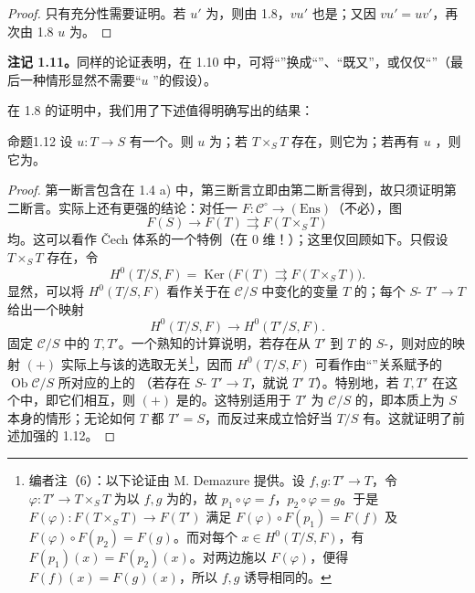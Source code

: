 \begin{proof}
只有充分性需要证明。若 $u'$ 为，则由 1.8，$vu'$ 也是；又因 $vu'=uv'$，再次由 1.8  $u$ 为。
\end{proof}
\textbf{注记 1.11。}同样的论证表明，在 1.10 中，可将“”换成“”、“既又”，或仅仅“”（最后一种情形显然不需要“$u$ ”的假设）。

在 1.8 的证明中，我们用了下述值得明确写出的结果：
\begin{SGAresult}{命题}{1.12}
设 $u:T\to S$ 有一个。则 $u$ 为；若 $T\times_S T$ 存在，则它为；若再有 $u$ ，则它为。
\end{SGAresult}
\begin{proof}
第一断言包含在 1.4 a) 中，第三断言立即由第二断言得到，故只须证明第二断言。实际上还有更强的结论：对任一 $F:\mathcal C^\circ\to(\mathrm{Ens})$（不必），图
\[
 F(S)\longrightarrow F(T)\rightrightarrows F(T\times_S T)
\]
均。这可以看作 Čech 体系的一个特例（在 $0$ 维！）；这里仅回顾如下。只假设 $T\times_S T$ 存在，令
\[
 H^0(T/S,F)=\operatorname{Ker}\bigl(F(T)\rightrightarrows F(T\times_S T)\bigr).
\]
显然，可以将 $H^0(T/S,F)$ 看作关于在 $\mathcal C/S$ 中变化的变量 $T$ 的；每个 $S$- $T'\to T$ 给出一个映射
\[
 H^0(T/S,F)\longrightarrow H^0(T'/S,F).\tag{+}
\]
固定 $\mathcal C/S$ 中的 $T,T'$。一个熟知的计算说明，若存在从 $T'$ 到 $T$ 的 $S$-，则对应的映射 $(+)$ 实际上与该的选取无关\footnote{编者注（6）：以下论证由 M. Demazure 提供。设 $f,g:T'\to T$，令 $\varphi:T'\to T\times_S T$ 为以 $f,g$ 为的，故 $p_1\circ\varphi=f$，$p_2\circ\varphi=g$。于是 $F(\varphi):F(T\times_S T)\to F(T')$ 满足 $F(\varphi)\circ F(p_1)=F(f)$ 及 $F(\varphi)\circ F(p_2)=F(g)$。而对每个 $x\in H^0(T/S,F)$，有 $F(p_1)(x)=F(p_2)(x)$。对两边施以 $F(\varphi)$，便得 $F(f)(x)=F(g)(x)$，所以 $f,g$ 诱导相同的。}，因而 $H^0(T/S,F)$ 可看作由“”关系赋予的 $\operatorname{Ob}\mathcal C/S$ 所对应的上的
（若存在 $S$- $T'\to T$，就说 $T'$  $T$）。特别地，若 $T,T'$ 在这个中，即它们相互，则 $(+)$ 是的。这特别适用于 $T'$ 为 $\mathcal C/S$ 的，即本质上为 $S$ 本身的情形；无论如何 $T$ 都 $T'=S$，而反过来成立恰好当 $T/S$ 有。这就证明了前述加强的 1.12。
\end{proof}
